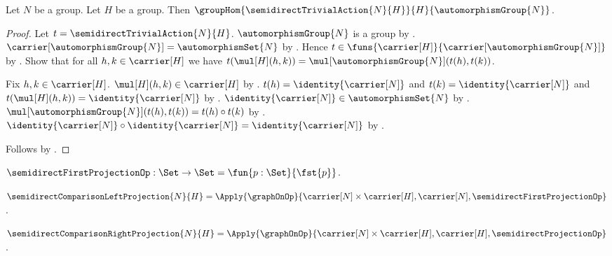 \begin{theorem}\label{semidirect_trivial_action_hom}
    Let $N$ be a group.
    Let $H$ be a group.
    Then
        $\groupHom{\semidirectTrivialAction{N}{H}}
            {H}{\automorphismGroup{N}}$.
\end{theorem}
\begin{proof}
    Let $t=\semidirectTrivialAction{N}{H}$.
    $\automorphismGroup{N}$ is a group by
        .
    $\carrier[\automorphismGroup{N}]=\automorphismSet{N}$ by
        .
    Hence $t\in\funs{\carrier[H]}
        {\carrier[\automorphismGroup{N}]}$ by
        .
    Show that for all $h,k\in\carrier[H]$ we have
        $t(\mul[H](h,k))=
            \mul[\automorphismGroup{N}](t(h),t(k))$.
    \begin{subproof}
        Fix $h,k\in\carrier[H]$.
        $\mul[H](h,k)\in\carrier[H]$ by
            .
        $t(h)=\identity{\carrier[N]}$ and
            $t(k)=\identity{\carrier[N]}$ and
            $t(\mul[H](h,k))=\identity{\carrier[N]}$ by
            .
        $\identity{\carrier[N]}\in\automorphismSet{N}$ by
            .
        $\mul[\automorphismGroup{N}](t(h),t(k))=t(h)\circ t(k)$ by
            .
        $\identity{\carrier[N]}\circ\identity{\carrier[N]}=
            \identity{\carrier[N]}$ by
            .
    \end{subproof}
    Follows by .
\end{proof}

\begin{definition}\label{semidirect_first_projection_op}
    $\semidirectFirstProjectionOp:\Set\to\Set
        =\fun{p:\Set}{\fst{p}}$.
\end{definition}

\begin{definition}\label{semidirect_comparison_left_projection}
    $\semidirectComparisonLeftProjection{N}{H}=
        \Apply{\graphOnOp}
            {\carrier[N]\times\carrier[H],\carrier[N],
             \semidirectFirstProjectionOp}$.
\end{definition}

\begin{definition}\label{semidirect_comparison_right_projection}
    $\semidirectComparisonRightProjection{N}{H}=
        \Apply{\graphOnOp}
            {\carrier[N]\times\carrier[H],\carrier[H],
             \semidirectProjectionOp}$.
\end{definition}

